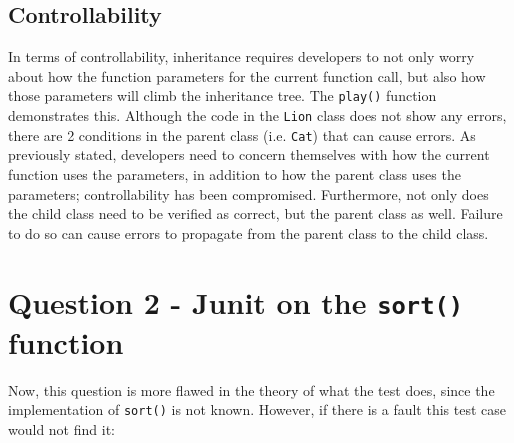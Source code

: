 \documentclass{article}
\begin{document}
\subsection{Controllability}

In terms of controllability, inheritance requires developers to not
only worry about how the function parameters for the current function
call, but also how those parameters will climb the inheritance tree.
The \texttt{play()} function demonstrates this. Although the code in
the \texttt{Lion} class does not show any errors, there are 2
conditions in the parent class (i.e. \texttt{Cat}) that can cause
errors. As previously stated, developers need to concern themselves
with how the current function uses the parameters, in addition to how
the parent class uses the parameters; controllability has been
compromised. Furthermore, not only does the child class need to be
verified as correct, but the parent class as well. Failure to do so
can cause errors to propagate from the parent class to the child
class.

\section{Question 2 - Junit on the \texttt{sort()} function}

Now, this question is more flawed in the theory of what the test does,
since the implementation of \texttt{sort()} is not known. However, if
there is a fault this test case would not find it:
\end{document}
